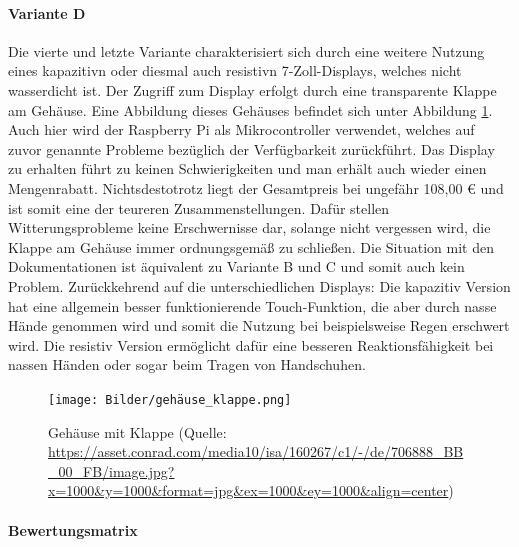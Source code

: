\paragraph{Variante D}
Die vierte und letzte Variante charakterisiert sich durch eine weitere Nutzung eines \gls{kapazitiv}n oder diesmal auch \gls{resistiv}n 7-Zoll-Displays, welches nicht wasserdicht ist. Der Zugriff zum Display erfolgt durch eine transparente Klappe am Gehäuse. Eine Abbildung dieses Gehäuses befindet sich unter Abbildung \ref{fig:gehäuse_mit_klappe}. Auch hier wird der Raspberry Pi als Mikrocontroller verwendet, welches auf zuvor genannte Probleme bezüglich der Verfügbarkeit zurückführt. Das Display zu erhalten führt zu keinen Schwierigkeiten und man erhält auch wieder einen Mengenrabatt. Nichtsdestotrotz liegt der Gesamtpreis bei ungefähr 108,00 € und ist somit eine der teureren Zusammenstellungen. Dafür stellen Witterungsprobleme keine Erschwernisse dar, solange nicht vergessen wird, die Klappe am Gehäuse immer ordnungsgemäß zu schließen. Die Situation mit den Dokumentationen ist äquivalent zu Variante B und C und somit auch kein Problem. Zurückkehrend auf die unterschiedlichen Displays: Die \gls{kapazitiv} Version hat eine allgemein besser funktionierende Touch-Funktion, die aber durch nasse Hände genommen wird und somit die Nutzung bei beispielsweise Regen erschwert wird. Die \gls{resistiv} Version ermöglicht dafür eine besseren Reaktionsfähigkeit bei nassen Händen oder sogar beim Tragen von Handschuhen.
\begin{figure}[ht]
	\centering
	\texttt{[image: Bilder/gehäuse\_klappe.png]}
	\caption{Gehäuse mit Klappe (Quelle: \url{https://asset.conrad.com/media10/isa/160267/c1/-/de/706888_BB_00_FB/image.jpg?x=1000&y=1000&format=jpg&ex=1000&ey=1000&align=center})}
	\label{fig:gehäuse_mit_klappe}
\end{figure}
\newpage
\paragraph{Bewertungsmatrix}

